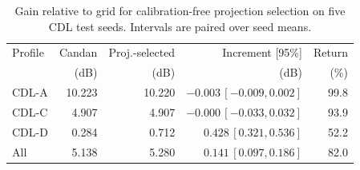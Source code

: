 \begin{table}[!t]
\centering
\caption{Gain relative to grid for calibration-free projection selection on five CDL test seeds. Intervals are paired over seed means.}
\label{tab:candan_gate_profiles}
\scriptsize
\setlength{\tabcolsep}{2.5pt}
\begin{tabular}{lrrrr}
\toprule
Profile & Candan & Proj.-selected & Increment [95\%] & Return \\
 & (dB) & (dB) & (dB) & (\%) \\
\midrule
CDL-A & 10.223 & 10.220 & $-0.003\,[-0.009,0.002]$ & 99.8 \\
CDL-C & 4.907 & 4.907 & $-0.000\,[-0.033,0.032]$ & 93.9 \\
CDL-D & 0.284 & 0.712 & $0.428\,[0.321,0.536]$ & 52.2 \\
All & 5.138 & 5.280 & $0.141\,[0.097,0.186]$ & 82.0 \\
\bottomrule
\end{tabular}
\end{table}
